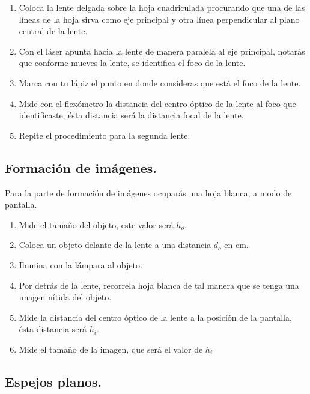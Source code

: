 \documentclass[14pt]{extarticle}
\begin{document}
\begin{enumerate}[label=\alph*)]
    \item Coloca la lente delgada sobre la hoja cuadriculada procurando que una de las líneas de la hoja sirva como eje principal y otra línea perpendicular al plano central de la lente.
    \item Con el láser apunta hacia la lente de manera paralela al eje principal, notarás que conforme mueves la lente, se identifica el foco de la lente.
    \item Marca con tu lápiz el punto en donde consideras que está el foco de la lente.
    \item Mide con el flexómetro la distancia del centro óptico de la lente al foco que identificaste, ésta distancia será la distancia focal de la lente.
    \item Repite el procedimiento para la segunda lente.
\end{enumerate}

\subsection{Formación de imágenes.}

Para la parte de formación de imágenes ocuparás una hoja blanca, a modo de pantalla.

\begin{enumerate}[label=\alph*)]
    \item Mide el tamaño del objeto, este valor será $h_{o}$.
    \item Coloca un objeto delante de la lente a una distancia $d_{o}$ en cm.
    \item Ilumina con la lámpara al objeto.
    \item Por detrás de la lente, recorrela hoja blanca de tal manera que se tenga una imagen nítida del objeto.
    \item Mide la distancia del centro óptico de la lente a la posición de la pantalla, ésta distancia será $h_{i}$.
    \item Mide el tamaño de la imagen, que será el valor de $h_{i}$
\end{enumerate}

\subsection{Espejos planos.}
\end{document}

